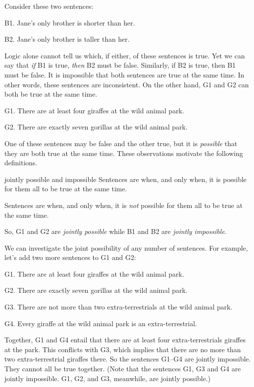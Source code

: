 Consider these two sentences:
	\begin{ebullet}
		\item[B1.] Jane's only brother is shorter than her.
		\item[B2.] Jane's only brother is taller than her.
	\end{ebullet}
Logic alone cannot tell us which, if either, of these sentences is true. Yet we can say that \emph{if} B1 is true, \emph{then} B2 must be false. Similarly, if B2 is true, then B1 must be false. It is impossible that both sentences are true at the same time. In other words, these sentences are inconsistent. On the other hand, G1 and G2 can both be true at the same time.
	\begin{ebullet}	
		\item[G1.] \label{MartianGiraffes} There are at least four giraffes at the wild animal park.
		\item[G2.] There are exactly seven gorillas at the wild animal park.
	\end{ebullet}
One of these sentences may be false and the other true, but it  is \textit{possible} that they are both true at the same time. These observations motivate the following definitions.
\begin{factboxy}{jointly possible and impossible}
Sentences are  when, and only when, it is possible for them all to be true at the same time.
\medskip

Sentences are  when, and only when, it is \textit{not} possible for them all to be true at the same time.
\end{factboxy}
\noindent So, G1 and G2 are \textit{jointly possible} while B1 and B2 are \emph{jointly impossible}.

We can investigate the joint possibility of any number of sentences. For example, let's add two more sentences to G1 and G2:
	\begin{ebullet}	
		\item[G1.] There are at least four giraffes at the wild animal park.
		\item[G2.] There are exactly seven gorillas at the wild animal park.
		\item[G3.] There are not more than two extra-terrestrials at the wild animal park.
		\item[G4.] Every giraffe at the wild animal park is an extra-terrestrial.
	\end{ebullet}
Together, G1 and G4 entail that there are at least four extra-terrestrials giraffes at the park. This conflicts with G3, which implies that there are no more than two extra-terrestrial giraffes there. So the sentences G1--G4 are jointly impossible. They cannot all be true together. (Note that the sentences G1, G3 and G4 are jointly impossible. G1, G2, and G3, meanwhile, are jointly possible.)

